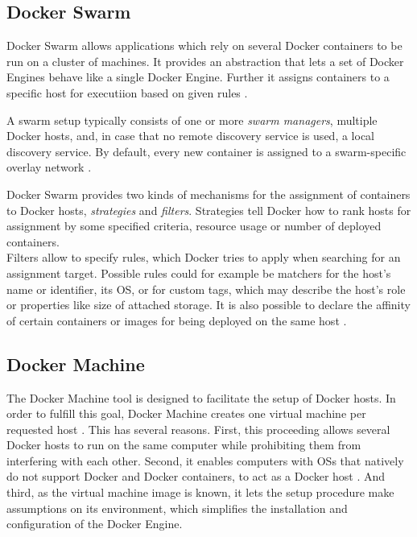   \subsection{Docker Swarm} %
  \label{sub:docker_swarm}
    Docker Swarm allows applications which rely on several Docker containers to be run on a cluster of machines. It provides an abstraction that lets a set of Docker Engines behave like a single Docker Engine. Further it assigns containers to a specific host for executiion based on given rules \cite{Docker????Dockerb}.

    A swarm setup typically consists of one or more \emph{swarm managers}, multiple Docker hosts, and, in case that no remote discovery service is used, a local discovery service. By default, every new container is assigned to a swarm-specific overlay network \cite{Docker????Dockera}.

    Docker Swarm provides two kinds of mechanisms for the assignment of containers to Docker hosts, \emph{strategies} and \emph{filters}. Strategies tell Docker how to rank hosts for assignment by some specified criteria, \eg resource usage or number of deployed containers. \\
    Filters allow to specify rules, which Docker tries to apply when searching for an assignment target. Possible rules could for example be matchers for the host's name or identifier, its \ac{OS}, or for custom tags, which may describe the host's role or properties like size of attached storage. It is also possible to declare the affinity of certain containers or images for being deployed on the same host \cite{Docker????Dockera}.


  \subsection{Docker Machine} %
  \label{sub:docker_machine}
    The Docker Machine tool is designed to facilitate the setup of Docker hosts. In order to fulfill this goal, Docker Machine creates one virtual machine per requested host \cite{Docker????Dockerb,Docker????Dockera}. This has several reasons. First, this proceeding allows several Docker hosts to run on the same computer while prohibiting them from interfering with each other. Second, it enables computers with \acp{OS} that natively do not support Docker and Docker containers, to act as a Docker host \cite{Docker????Dockera}. And third, as the virtual machine image is known, it lets the setup procedure make assumptions on its environment, which simplifies the installation and configuration of the Docker Engine.

